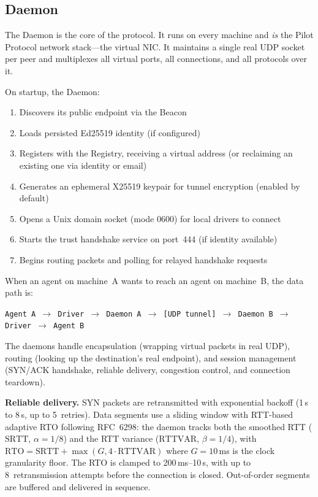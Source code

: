 \documentclass[11pt,a4paper]{article}
\begin{document}
\subsection{Daemon}

The Daemon is the core of the protocol. It runs on every machine and \emph{is} the Pilot Protocol network stack---the virtual NIC. It maintains a single real UDP socket per peer and multiplexes all virtual ports, all connections, and all protocols over it.

On startup, the Daemon:
\begin{enumerate}
    \item Discovers its public endpoint via the Beacon
    \item Loads persisted Ed25519 identity (if configured)
    \item Registers with the Registry, receiving a virtual address (or reclaiming an existing one via identity or email)
    \item Generates an ephemeral X25519 keypair for tunnel encryption (enabled by default)
    \item Opens a Unix domain socket (mode 0600) for local drivers to connect
    \item Starts the trust handshake service on port~444 (if identity available)
    \item Begins routing packets and polling for relayed handshake requests
\end{enumerate}

When an agent on machine~A wants to reach an agent on machine~B, the data path is:

\begin{center}
\texttt{Agent\,A $\rightarrow$ Driver $\rightarrow$ Daemon\,A $\rightarrow$ [UDP tunnel] $\rightarrow$ Daemon\,B $\rightarrow$ Driver $\rightarrow$ Agent\,B}
\end{center}

The daemons handle encapsulation (wrapping virtual packets in real UDP), routing (looking up the destination's real endpoint), and session management (SYN/ACK handshake, reliable delivery, congestion control, and connection teardown).

\textbf{Reliable delivery.} SYN packets are retransmitted with exponential backoff (1\,s to 8\,s, up to 5~retries). Data segments use a sliding window with RTT-based adaptive RTO following RFC~6298: the daemon tracks both the smoothed RTT ($\text{SRTT}$, $\alpha = 1/8$) and the RTT variance ($\text{RTTVAR}$, $\beta = 1/4$), with $\text{RTO} = \text{SRTT} + \max(G, 4 \cdot \text{RTTVAR})$ where $G = 10$\,ms is the clock granularity floor. The RTO is clamped to 200\,ms--10\,s, with up to 8~retransmission attempts before the connection is closed. Out-of-order segments are buffered and delivered in sequence.
\end{document}
